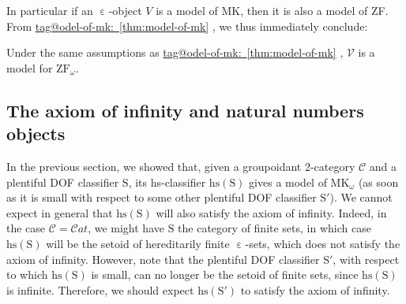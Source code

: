 \documentclass{amsart}
\makeatletter
\newcommand\Cat{\mathcal{C}at}
\newcommand\cC{\mathcal{C}}
\newcommand\cV{\mathcal{V}}
\newcommand\ein{\mathrel{\varepsilon}}
\newcommand\hs{\mathrm{hs}}
\newcommand\MKo{\mathrm{MK}_{\omega}}
\newcommand\rS{\mathrm{S}}
\newcommand\unein{{\ein}}
\newcommand\ZFo{\mathrm{ZF}_\omega}
\newcommand\tagword[1]{\csname tag@#1\endcsname}
\def\label@tag#1:#2\@nil{#1}
\newcommand\labeltag[1]{\label@tag#1:\@nil}
\newcommand\jref[1]{%
  \texorpdfstring%
    {\hyperref[#1]{\tagword{\labeltag{#1}}~\ref*{#1}}}%
    {\tagword{\labeltag{#1}}~\ref*{#1}}%
}
\theoremstyle{definition}
\theoremstyle{remark}
\theoremstyle{plainwithref}
\makeatother
\begin{document}
In particular if an \( \unein \)-object \( V \) is a model of MK, then it is also a model of ZF.
From \jref{thm:model-of-mk}, we thus immediately conclude:
\begin{cor}
  Under the same assumptions as \jref{thm:model-of-mk}, \( \cV \) is a model for \( \ZFo \).
\end{cor}

\subsection{The axiom of infinity and natural numbers objects} \label{subsec:infinity}
In the previous section, we showed that, given a groupoidant 2-category \( \cC \) and a plentiful DOF classifier \( \rS \), its hs-classifier \( \hs(\rS) \) gives a model of \( \MKo \) (as soon as it is small with respect to some other plentiful DOF classifier \( \rS' \)).
We cannot expect in general that \( \hs(\rS) \) will also satisfy the axiom of infinity.
Indeed, in the case \( \cC = \Cat \), we might have \( \rS \) the category of finite sets, in which case \( \hs(\rS) \) will be the setoid of hereditarily finite \( \unein \)-sets, which does not satisfy the axiom of infinity.
However, note that the plentiful DOF classifier \( \rS' \), with respect to which \( \hs(\rS) \) is small, can no longer be the setoid of finite sets, since \( \hs(\rS) \) is infinite.
Therefore, we should expect \( \hs(\rS') \) to satisfy the axiom of infinity.
\end{document}
